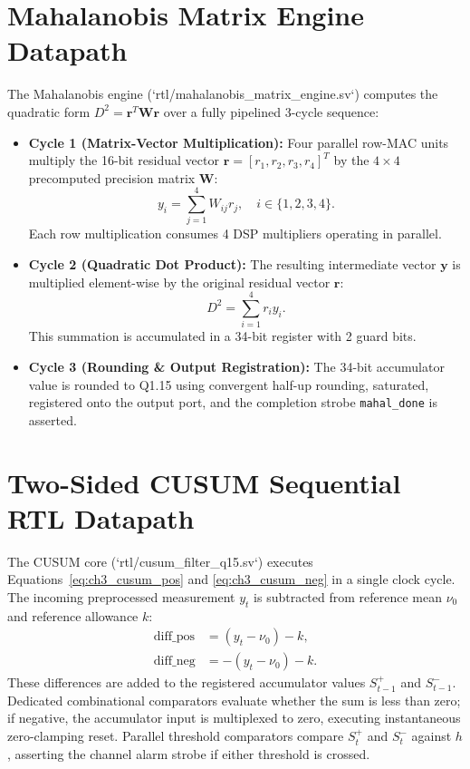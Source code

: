 \documentclass[12pt,a4paper]{report}
\begin{document}
\section{Mahalanobis Matrix Engine Datapath}
The Mahalanobis engine (`rtl/mahalanobis_matrix_engine.sv`) computes the quadratic form
$D^2 = \boldsymbol{r}^T \boldsymbol{W} \boldsymbol{r}$ over a fully pipelined 3-cycle sequence:
\begin{itemize}
    \item \textbf{Cycle 1 (Matrix-Vector Multiplication):} Four parallel row-MAC units multiply
    the 16-bit residual vector $\boldsymbol{r} = [r_1, r_2, r_3, r_4]^T$ by the $4 \times 4$
    precomputed precision matrix $\boldsymbol{W}$:
    \begin{equation}
    y_i = \sum_{j=1}^4 W_{ij} r_j, \quad i \in \{1, 2, 3, 4\}.
    \end{equation}
    Each row multiplication consumes 4 DSP multipliers operating in parallel.
    \item \textbf{Cycle 2 (Quadratic Dot Product):} The resulting intermediate vector $\boldsymbol{y}$
    is multiplied element-wise by the original residual vector $\boldsymbol{r}$:
    \begin{equation}
    D^2 = \sum_{i=1}^4 r_i y_i.
    \end{equation}
    This summation is accumulated in a 34-bit register with 2 guard bits.
    \item \textbf{Cycle 3 (Rounding & Output Registration):} The 34-bit accumulator value is
    rounded to Q1.15 using convergent half-up rounding, saturated, registered onto the output
    port, and the completion strobe \texttt{mahal\_done} is asserted.
\end{itemize}

\section{Two-Sided CUSUM Sequential RTL Datapath}
The CUSUM core (`rtl/cusum_filter_q15.sv`) executes Equations~\eqref{eq:ch3_cusum_pos} and
\eqref{eq:ch3_cusum_neg} in a single clock cycle. The incoming preprocessed measurement $y_t$
is subtracted from reference mean $\nu_0$ and reference allowance $k$:
\begin{align}
\text{diff\_pos} &= (y_t - \nu_0) - k, \\
\text{diff\_neg} &= -(y_t - \nu_0) - k.
\end{align}
These differences are added to the registered accumulator values $S_{t-1}^+$ and $S_{t-1}^-$.
Dedicated combinational comparators evaluate whether the sum is less than zero; if negative,
the accumulator input is multiplexed to zero, executing instantaneous zero-clamping reset.
Parallel threshold comparators compare $S_t^+$ and $S_t^-$ against $h$, asserting the channel
alarm strobe if either threshold is crossed.
\end{document}
